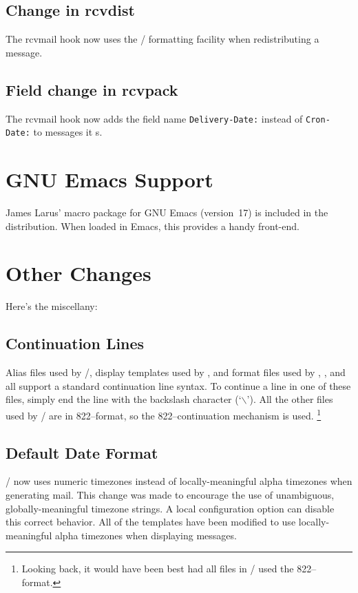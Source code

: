 \subsection*	{Change in rcvdist}
The  rcvmail hook now uses the \MH/ formatting facility when
redistributing a message.

\subsection*	{Field change in rcvpack}
The  rcvmail hook now adds the field name \verb"Delivery-Date:"
instead of \verb"Cron-Date:" to messages it s.

\section*	{GNU Emacs Support}
James Larus'  macro package for GNU Emacs (version~17) is included
in the distribution.
When loaded in Emacs, this provides a handy front-end.

\section*	{Other Changes}
Here's the miscellany:

\subsection*	{Continuation Lines}
Alias files used by \MH/,
display templates used by ,
and format files used by , , and  all support
a standard continuation line syntax.
To continue a line in one of these files,
simply end the line with the backslash character (`$\backslash$').
All the other files used by \MH/ are in 822--format,
so the 822--continuation mechanism is used.%
\footnote{Looking back,
it would have been best had all files in \MH/ used the 822--format.}

\subsection*	{Default Date Format}
\MH/ now uses numeric timezones instead of locally-meaningful alpha timezones
when generating mail.
This change was made to encourage the use of unambiguous, globally-meaningful
timezone strings.
A local configuration option can disable this correct behavior.
All of the  templates have been modified to use locally-meaningful
alpha timezones when displaying messages.

